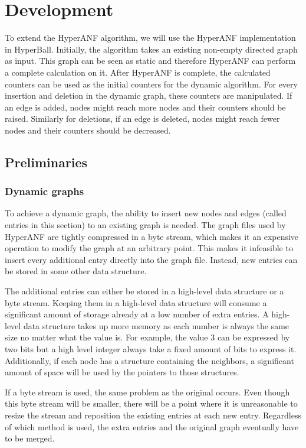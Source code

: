 \chapter{Development}
To extend the HyperANF algorithm, we will use the HyperANF implementation in HyperBall. Initially, the algorithm takes an existing non-empty directed graph as input. This graph can be seen as static and therefore HyperANF can perform a complete calculation on it. After HyperANF is complete, the calculated counters can be used as the initial counters for the dynamic algorithm. For every insertion and deletion in the dynamic graph, these counters are manipulated. If an edge is added, nodes might reach more  nodes and their counters should be raised. Similarly for deletions, if an edge is deleted, nodes might reach fewer nodes and their counters should be decreased.

\section{Preliminaries}

\subsection{Dynamic graphs}

To achieve a dynamic graph, the ability to insert new nodes and edges (called entries in this section) to an existing graph is needed. The graph files used by HyperANF are tightly compressed in a byte stream, which makes it an expensive operation to modify the graph at an arbitrary point. This makes it infeasible to insert every additional entry directly into the graph file. Instead, new entries can be stored in some other data structure.

The additional entries can either be stored in a high-level data structure or a byte stream. Keeping them in a high-level data structure will consume a significant amount of storage already at a low number of extra entries. A high-level data structure takes up more memory as each number is always the same size no matter what the value is. For example, the value 3 can be expressed by two bits but a high level integer always take a fixed amount of bits to express it.  Additionally, if each node has a structure containing the neighbors, a significant amount of space will be used by the pointers to those structures. 

If a byte stream is used, the same problem as the original occurs. Even though this byte stream will be smaller, there will be a point where it is unreasonable to resize the stream and reposition the existing entries at each new entry. Regardless of which method is used, the extra entries and the original graph eventually have to be merged.

